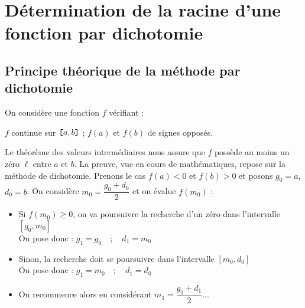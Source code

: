 \section{Détermination de la racine d'une fonction par dichotomie}

\subsection{Principe théorique de la méthode par dichotomie}
On considère une fonction $f$ vérifiant : 
\begin{center} $f$ continue sur $\verb![!a,b\verb!]!$ ;  $f(a)$ et $f(b)$ de signes opposés.
\end{center} Le théorème des valeurs intermédiaires nous assure que $f$ possède au moins un zéro $\ell$ entre $a$ et $b$. La preuve, vue en cours de mathématiques, repose sur la méthode de dichotomie. Prenons le cas $f(a)<0$ et $f(b)>0$ et posons $g_0=a$, $d_0=b$. 
 On considère $m_0 = \dfrac{g_0+d_0}{2}$ et on évalue $f(m_0)$ : 
\begin{itemize}
 \item Si $f(m_0)\geq 0$, on va poursuivre la recherche d'un zéro dans l'intervalle  {$[g_0,m_0]$} \\On pose donc  : 
 $g_1 =  {g_0} \quad ;\quad  d_1 =  {m_0}$\vspace*{2mm}
  \item Sinon,  la recherche doit se poursuivre  dans l'intervalle  {$[m_0,d_0]$} \\ On pose donc  : 
 $g_1 =  {m_0} \quad ; \quad d_1 =  {d_0}$\vspace*{2mm}
 \item On recommence alors en considérant $m_1 = \dfrac{g_1+d_1}{2}$...\\
 \end{itemize}


